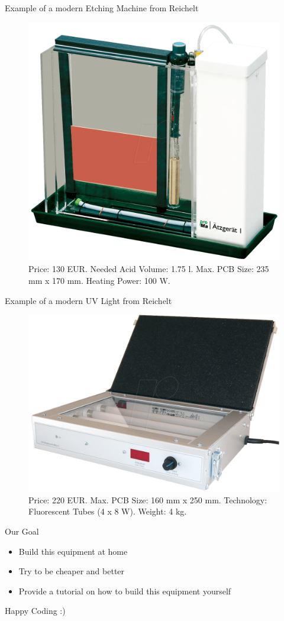 \documentclass[apectratio=169]{beamer}
\begin{document}
\begin{frame}{Example of a modern Etching Machine from Reichelt}
\begin{figure}
    \centering
    \includegraphics[scale = 0.13]{./fig/reichelt1}
    \caption{Price: 130 EUR. Needed Acid Volume: 1.75 l. Max. PCB Size: 235 mm x 170 mm. Heating Power: 100 W.}
  \end{figure}	
\end{frame}

\begin{frame}{Example of a modern UV Light from Reichelt}
\begin{figure}
    \centering
    \includegraphics[scale = 0.2]{./fig/reichelt2}
    \caption{Price: 220 EUR. Max. PCB Size: 160 mm x 250 mm. Technology: Fluorescent Tubes (4 x 8 W). Weight: 4 kg.}
  \end{figure}	
\end{frame}

\begin{frame}{Our Goal}
  \begin{itemize}
    \item<1-> Build this equipment at home 
    \item<2-> Try to be cheaper and better
    \item<3> Provide a tutorial on how to build this equipment yourself
  \end{itemize}
\end{frame}

\begin{frame}[standout]
  Happy Coding :) 
\end{frame}
\end{document}

